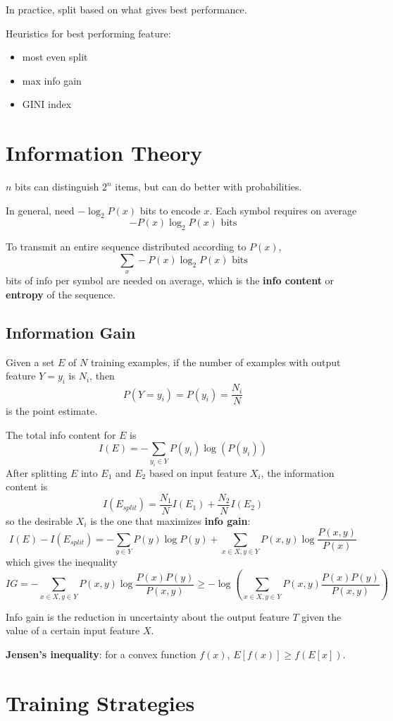 \documentclass[11pt]{article}
\begin{document}
In practice, split based on what gives best performance.

Heuristics for best performing feature:
\begin{itemize}
\item most even split
\item max info gain
\item GINI index
\end{itemize}
\section{Information Theory}
\label{sec:org5908e32}
\(n\) bits can distinguish \(2^{n}\) items, but can do better with probabilities.

In general, need \(-\log_{2} P(x)\) bits to encode \(x\).
Each symbol requires on average
$$
-P(x)\log_{2} P(x) \text{ bits}
$$

To transmit an entire sequence distributed according to \(P(x)\),
$$
\sum_{x} -P(x)\log_{2} P(x) \text{ bits}
$$
bits of info per symbol are needed on average, which is the \textbf{info content} or \textbf{entropy} of the sequence.
\subsection{Information Gain}
\label{sec:orgbf764a1}
Given a set \(E\) of \(N\) training examples, if the number of examples with output feature \(Y = y_{i}\)
is \(N_{i}\), then
$$
P(Y = y_{i}) = P(y_{i}) = \frac{N_{i}}{N}
$$
is the point estimate.

The total info content for \(E\) is
$$
I(E) = - \sum_{y_{i} \in Y} P(y_{i}) \log( P(y_{i}) )
$$
After splitting \(E\) into \(E_{1}\) and \(E_{2}\) based on input feature \(X_{i}\), the information
content is
$$
I(E_{split}) = \frac{N_{1}}{N} I(E_{1}) + \frac{N_{2}}{N} I(E_{2})
$$
so the desirable \(X_{i}\) is the one that maximizes \textbf{info gain}:
$$
I(E) - I(E_{split}) = - \sum_{y \in Y} P(y) \log P(y) + \sum_{x \in X, y \in Y}P(x,y) \log  \frac{P(x,y)}{P(x)}
$$
which gives the inequality
$$
IG = - \sum_{x \in X, y \in Y} P(x,y) \log \frac{P(x) P(y)}{P(x,y)} \ge -\log \left( \sum_{x \in X, y \in Y} P(x, y) \frac{P(x)P(y)}{P(x, y)} \right)
$$

Info gain is the reduction in uncertainty about the output feature \(T\) given the value
of a certain input feature \(X\).

\textbf{Jensen's inequality}: for a convex function \(f(x)\), \(E[f(x)] \ge f(E[x])\).
\section{Training Strategies}
\label{sec:orgd7f2e65}
\end{document}
